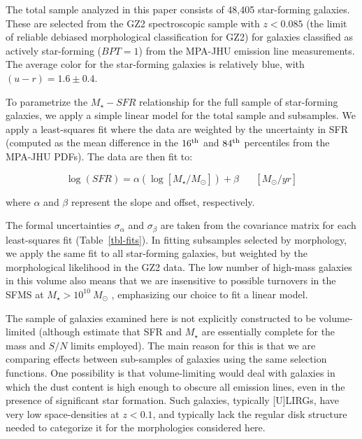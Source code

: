 \documentclass[useAMS,usenatbib]{mn2e}
\def\rr{\color{titlecol}}
\begin{document}
The total sample analyzed in this paper consists of 48,405 star-forming galaxies. These are selected from the GZ2 spectroscopic sample with $z<0.085$ (the limit of reliable debiased morphological classification for GZ2) for galaxies classified as actively star-forming ($BPT=1$) from the MPA-JHU emission line measurements. The average color for the star-forming galaxies is relatively blue, with $(u-r)=1.6\pm0.4$. 

To parametrize the $M_\star-SFR$ relationship for the full sample of star-forming galaxies, we apply a simple linear model for the total sample and subsamples. We apply a least-squares fit where the data are weighted by the uncertainty in SFR (computed as the mean difference in the $16^{\rm th}$ and $84^{\rm th}$ percentiles from the MPA-JHU PDFs). The data are then fit to:

\begin{equation}
\log(SFR) = \alpha(\log[M_\star/M_\odot]) + \beta \hspace{20pt}[M_\odot/yr]
\label{eqn-linearfit}
\end{equation}

\noindent where $\alpha$ and $\beta$ represent the slope and offset, respectively. {\rr The formal uncertainties $\sigma_\alpha$ and $\sigma_\beta$ are taken from the covariance matrix for each least-squares fit (Table~\ref{tbl-fits}). In fitting subsamples selected by morphology, we apply the same fit to all star-forming galaxies, but weighted by the morphological likelihood in the GZ2 data. The low number of high-mass galaxies in this volume also means that we are insensitive to possible turnovers in the SFMS at $M_\star>10^{10}~M_\odot$ \citep{whi14,lee15}, emphasizing our choice to fit a linear model. 


The sample of galaxies examined here is not explicitly constructed to be volume-limited (although \citealt{bri04} estimate that SFR and $M_\star$ are essentially complete for the mass and $S/N$ limits employed). The main reason for this is that we are comparing effects between sub-samples of galaxies using the same selection functions. One possibility is that volume-limiting would deal with galaxies in which the dust content is high enough to obscure all emission lines, even in the presence of significant star formation. Such galaxies, typically [U]LIRGs, have very low space-densities at $z<0.1$, and typically lack the regular disk structure needed to categorize it for the morphologies considered here.}
\end{document}
